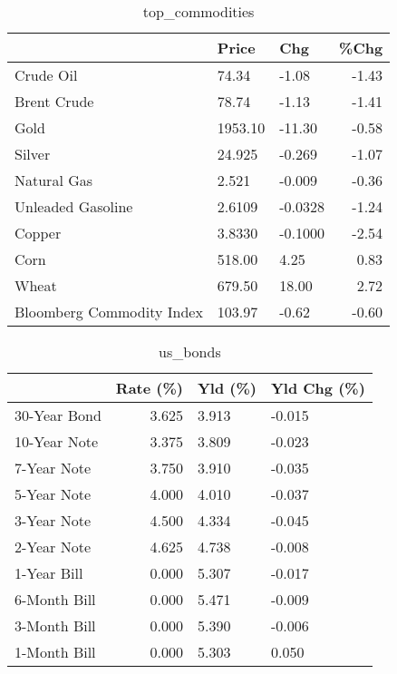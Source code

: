 \documentclass{article}%
\begin{document}
\begin{table}[htbp]%
\caption{top\_commodities}%
\centering%
\begin{adjustbox}{width=1\textwidth}%
\begin{tabular}{lllr}
\toprule
                          &   Price &     Chg &  \%Chg \\
\midrule
               Crude Oil  &   74.34 &   -1.08 & -1.43 \\
             Brent Crude  &   78.74 &   -1.13 & -1.41 \\
                    Gold  & 1953.10 &  -11.30 & -0.58 \\
                  Silver  &  24.925 &  -0.269 & -1.07 \\
             Natural Gas  &   2.521 &  -0.009 & -0.36 \\
       Unleaded Gasoline  &  2.6109 & -0.0328 & -1.24 \\
                  Copper  &  3.8330 & -0.1000 & -2.54 \\
                    Corn  &  518.00 &    4.25 &  0.83 \\
                   Wheat  &  679.50 &   18.00 &  2.72 \\
Bloomberg Commodity Index &  103.97 &   -0.62 & -0.60 \\
\bottomrule
\end{tabular}
%
\end{adjustbox}%
\end{table}

%


\begin{table}[htbp]%
\caption{us\_bonds}%
\centering%
\begin{adjustbox}{width=1\textwidth}%
\begin{tabular}{lrll}
\toprule
             &  Rate (\%) & Yld (\%) & Yld Chg (\%) \\
\midrule
30-Year Bond &     3.625 &   3.913 &      -0.015 \\
10-Year Note &     3.375 &   3.809 &      -0.023 \\
 7-Year Note &     3.750 &   3.910 &      -0.035 \\
 5-Year Note &     4.000 &   4.010 &      -0.037 \\
 3-Year Note &     4.500 &   4.334 &      -0.045 \\
 2-Year Note &     4.625 &   4.738 &      -0.008 \\
 1-Year Bill &     0.000 &   5.307 &      -0.017 \\
6-Month Bill &     0.000 &   5.471 &      -0.009 \\
3-Month Bill &     0.000 &   5.390 &      -0.006 \\
1-Month Bill &     0.000 &   5.303 &       0.050 \\
\bottomrule
\end{tabular}
%
\end{adjustbox}%
\end{table}
\end{document}
